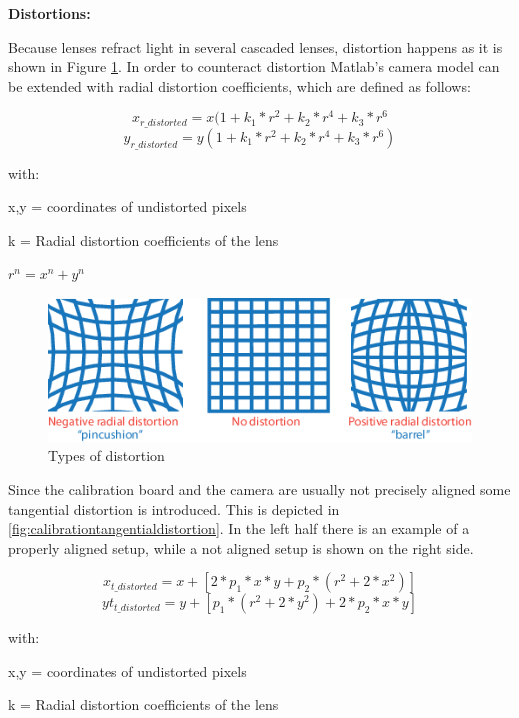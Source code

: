\newpage
\textbf{Distortions:}


Because lenses refract light in several cascaded lenses, distortion happens as it is shown in Figure \ref{fig:calibrationradialdistortion}. 
In order to counteract distortion Matlab's camera model can be extended with radial distortion coefficients, which are defined as follows:

\begin{equation}
x_{r\_distorted} = x(1 + k_1*r^2 + k_2*r^4 + k_3*r^6
\end{equation}
\begin{equation}
y_{r\_distorted} = y(1 + k_1*r^2 + k_2*r^4 + k_3*r^6)
\end{equation}

with:

x,y = coordinates of undistorted pixels

k = Radial distortion coefficients of the lens

$r^n = x^n + y^n$

\begin{figure}[H]
	\centering
	\includegraphics[width=0.5\linewidth]{graphics/calibration_radial_distortion}
	\caption[]{Types of distortion}
	
	\label{fig:calibrationradialdistortion}
\end{figure}



Since the calibration board and the camera are usually not precisely aligned some tangential distortion is introduced. This is depicted in \ref{fig:calibrationtangentialdistortion}. In the left half there is an example of a properly aligned setup, while a not aligned setup is shown on the right side.

\begin{equation}
x_{t\_distorted} = x + [2 * p_1 * x * y + p_2 * (r^2 + 2 * x^2)]
\end{equation}
\begin{equation}
yt_{t\_distorted} = y + [p_1 * (r^2 + 2 *y^2) + 2 * p_2 * x * y]
\end{equation}


with:

x,y = coordinates of undistorted pixels

k = Radial distortion coefficients of the lens

